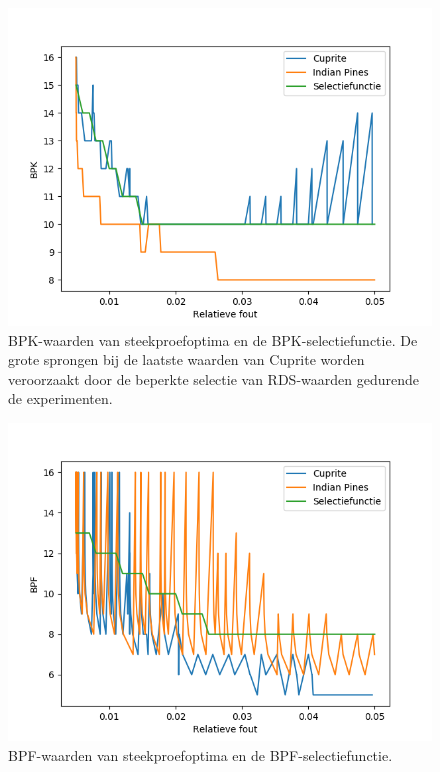 \begin{itemize}
\begin{figure}[H]
  \centering
  \includegraphics[scale=0.7]{images/filtered_sweep_points_BPK.png}
  \caption{BPK-waarden van steekproefoptima en de BPK-selectiefunctie. De grote sprongen bij de laatste waarden van Cuprite worden veroorzaakt door de beperkte selectie van RDS-waarden gedurende de experimenten.}
  \label{fig:filtered_sweep_points_BPK}
\end{figure}

\newpage

\begin{figure}[H]
  \centering
  \includegraphics[scale=0.7]{images/filtered_sweep_points_BPF.png}
  \caption{BPF-waarden van steekproefoptima en de BPF-selectiefunctie.}
  \label{fig:filtered_sweep_points_BPF}
\end{figure}


\end{itemize}
